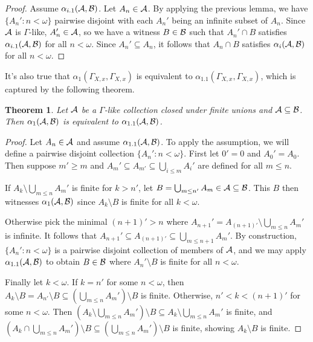\documentclass{amsart}
\theoremstyle{plain}
\newtheorem{theorem}{Theorem}
\theoremstyle{definition}
\theoremstyle{remark}
\theoremstyle{plain}
\theoremstyle{definition}
\theoremstyle{remark}
\begin{document}
\begin{proof}
Assume \(\alpha_{i.1}(\mathcal{A},\mathcal{B})\).
Let \(A_n\in\mathcal{A}\). By applying the previous lemma, we have
\(\{A_n':n<\omega\}\) pairwise disjoint with each \(A_n'\) being
an infinite subset of \(A_n\). Since \(\mathcal{A}\) is \(\Gamma\)-like,
\(A_n'\in\mathcal{A}\), so we have a witness \(B\in\mathcal{B}\) such that
\(A_n'\cap B\) satisfies \(\alpha_{i.1}(\mathcal{A},\mathcal{B})\) for all \(n<\omega\).
Since \(A_n'\subseteq A_n\), it follows that \(A_n\cap B\) satisfies
\(\alpha_{i}(\mathcal{A},\mathcal{B})\) for all \(n<\omega\).
\end{proof}

It's also true that \(\alpha_1(\Gamma_{X,x},\Gamma_{X,x})\)
is equivalent to \(\alpha_{1.1}(\Gamma_{X,x},\Gamma_{X,x})\),
which is captured by the following theorem.

\begin{theorem}
Let \(\mathcal{A}\) be a \(\Gamma\)-like collection closed under finite unions
and \(\mathcal{A}\subseteq\mathcal{B}\).
Then \(\alpha_1(\mathcal{A},\mathcal{B})\) is equivalent to
\(\alpha_{1.1}(\mathcal{A},\mathcal{B})\).
\end{theorem}
 
\begin{proof}
Let \(A_n\in\mathcal{A}\) and assume \(\alpha_{1.1}(\mathcal{A},\mathcal{B})\).
To apply the assumption, we will define a pairwise disjoint
collection \(\{A_n':n<\omega\}\). First let \(0'=0\) and \(A_0'=A_0\).
Then suppose \(m'\geq m\) and \(A_m'\subseteq A_{m'}\subseteq\bigcup_{i\leq m}A_i'\) 
are defined for all \(m\leq n\).

If \(A_k\setminus\bigcup_{m\leq n}A_m'\) is finite for \(k>n'\), let
\(B=\bigcup_{m\leq n'}A_m\in\mathcal{A}\subseteq\mathcal{B}\). This \(B\) then witnesses 
\(\alpha_1(\mathcal{A},\mathcal{B})\) since \(A_k\setminus B\) is finite for all \(k<\omega\).

Otherwise pick the minimal \((n+1)'>n\) where 
\(A_{n+1}'=A_{(n+1)'}\setminus\bigcup_{m\leq n}A_m'\) is infinite.
It follows that \(A_{n+1}'\subseteq A_{(n+1)'}\subseteq \bigcup_{m\leq n+1}A_m'\).
By construction, \(\{A_n':n<\omega\}\) is a pairwise disjoint collection of
members of \(\mathcal{A}\), and we may
apply \(\alpha_{1.1}(\mathcal{A},\mathcal{B})\) to obtain \(B\in\mathcal{B}\) where
\(A_n'\setminus B\) is finite for all \(n<\omega\).

Finally let \(k<\omega\). If \(k=n'\) for some \(n<\omega\), then 
\(A_k\setminus B=A_{n'}\setminus B\subseteq (\bigcup_{m\leq n}A_m')\setminus B\) 
is finite.
Otherwise, \(n'<k<(n+1)'\) for some \(n<\omega\).
Then 
\((A_k\setminus\bigcup_{m\leq n}A_m')\setminus B\subseteq A_k\setminus\bigcup_{m\leq n}A_m'\)
is finite, and 
\((A_k\cap\bigcup_{m\leq n}A_m')\setminus B\subseteq(\bigcup_{m\leq n}A_m')\setminus B\)
is finite, showing \(A_k\setminus B\) is finite.
\end{proof}
\end{document}
